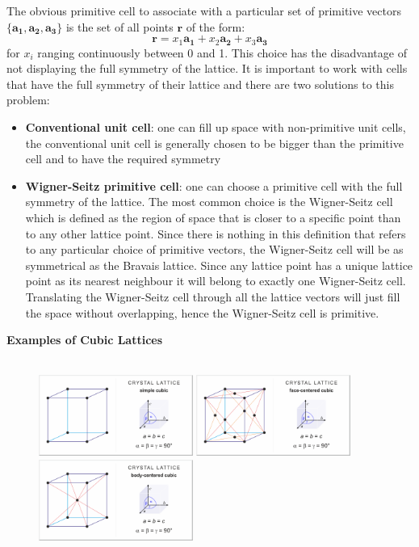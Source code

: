 \documentclass[10.75pt,a4paper,openright,bottom=2cm]{article}
\renewcommand{\Vec}[1]{\boldsymbol{#1}}
\begin{document}
The obvious primitive cell to associate with a particular set of primitive vectors $\{\Vec{a_1},\Vec{a_2},\Vec{a_3}\}$ is the set of all points $\Vec{r}$ of the form:
\[
\Vec{r}=x_1\Vec{a_1}+x_2\Vec{a_2}+x_3\Vec{a_3}
\]
for $x_i$ ranging continuously between 0 and 1. This choice has the disadvantage of not displaying the full symmetry of the lattice. It is important to work with cells that have the full symmetry of their lattice and there are two solutions to this problem:
\begin{itemize}
    \item \textbf{Conventional unit cell}: one can fill up space with non-primitive unit cells, the conventional unit cell is generally chosen to be bigger than the primitive cell and to have the required symmetry
    \item \textbf{Wigner-Seitz primitive cell}: one can choose a primitive cell with the full symmetry of the lattice. The most common choice is the Wigner-Seitz cell which is defined as the region of space that is closer to a specific point than to any other lattice point. Since there is nothing in this definition that refers to any particular choice of primitive vectors, the Wigner-Seitz cell will be as symmetrical as the Bravais lattice. Since any lattice point has a unique lattice point as its nearest neighbour it will belong to exactly one Wigner-Seitz cell. Translating the Wigner-Seitz cell through all the lattice vectors will just fill the space without overlapping, hence the Wigner-Seitz cell is primitive.
\end{itemize}
\newpage
\noindent
\textbf{Examples of Cubic Lattices}\\\\
\begin{figure}
    \vspace{-0.75cm}
    \includegraphics[width=0.45\textwidth]{simple_cubic_lattice.png}
    \includegraphics[width=0.45\textwidth]{face-centered_cubic_lattice.png}
    \includegraphics[width=0.45\textwidth]{body-centered_cubic_lattice.png}
    \end{figure}
\end{document}
